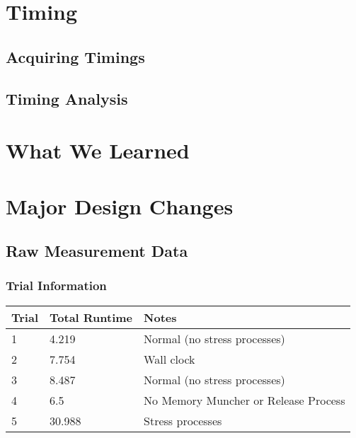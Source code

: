 \documentclass[12pt]{report}
\begin{document}
\part{Timing}

\chapter{Acquiring Timings}

\chapter{Timing Analysis}

\part{What We Learned}

\part{Major Design Changes}


\appendix
\chapter{Raw Measurement Data}
\label{appendix:raw_data}

\section{Trial Information}

\begin{tabular}{l | l | l}
    Trial&Total Runtime&Notes \\
    \hline
    1&4.219&Normal (no stress processes) \\
    2&7.754&Wall clock \\
    3&8.487&Normal (no stress processes)\\
    4&6.5&No Memory Muncher or Release Process \\
    5&30.988&Stress processes \\
\end{tabular}
\end{document}

